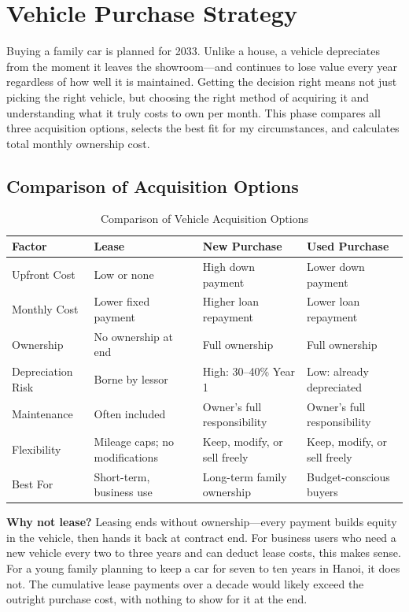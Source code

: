 \chapter{Vehicle Purchase Strategy}

Buying a family car is planned for 2033. Unlike a house, a vehicle depreciates from the moment it leaves the showroom---and continues to lose value every year regardless of how well it is maintained. Getting the decision right means not just picking the right vehicle, but choosing the right method of acquiring it and understanding what it truly costs to own per month. This phase compares all three acquisition options, selects the best fit for my circumstances, and calculates total monthly ownership cost.

\section{Comparison of Acquisition Options}

\begin{table}[h!]
\caption{Comparison of Vehicle Acquisition Options}
\label{tab:vehicle_options}
\begin{tabularx}{\linewidth}{@{}lLLL@{}}
\toprule
\textbf{Factor} & \textbf{Lease} & \textbf{New Purchase} & \textbf{Used Purchase} \\
\midrule
Upfront Cost   & Low or none & High down payment & Lower down payment \\
Monthly Cost   & Lower fixed payment & Higher loan repayment & Lower loan repayment \\
Ownership      & No ownership at end & Full ownership & Full ownership \\
Depreciation Risk & Borne by lessor & High: 30--40\% Year 1 & Low: already depreciated \\
Maintenance    & Often included & Owner's full responsibility & Owner's full responsibility \\
Flexibility    & Mileage caps; no modifications & Keep, modify, or sell freely & Keep, modify, or sell freely \\
Best For       & Short-term, business use & Long-term family ownership & Budget-conscious buyers \\
\bottomrule
\end{tabularx}
\end{table}

\textbf{Why not lease?} Leasing ends without ownership---every payment builds equity in the vehicle, then hands it back at contract end. For business users who need a new vehicle every two to three years and can deduct lease costs, this makes sense. For a young family planning to keep a car for seven to ten years in Hanoi, it does not. The cumulative lease payments over a decade would likely exceed the outright purchase cost, with nothing to show for it at the end.

